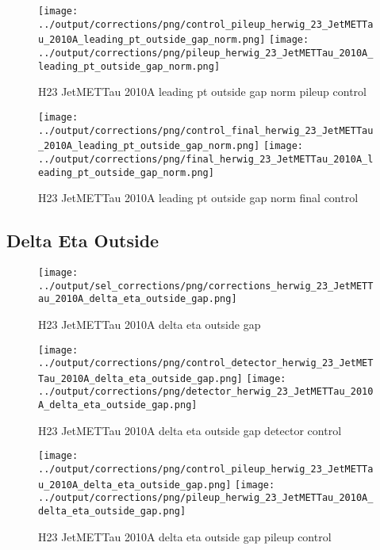 \documentclass[11pt]{book}
\begin{document}
\begin{figure}[ht]
\centering
\texttt{[image: ../output/corrections/png/control\_pileup\_herwig\_23\_JetMETTau\_2010A\_leading\_pt\_outside\_gap\_norm.png]}
\texttt{[image: ../output/corrections/png/pileup\_herwig\_23\_JetMETTau\_2010A\_leading\_pt\_outside\_gap\_norm.png]}
\caption{H23 JetMETTau 2010A leading pt outside gap norm pileup control}
\label{fig:H23_JetMETTau_2010A_leading_pt_outside_gap_norm_pileup_control}
\end{figure}


\begin{figure}[ht]
\centering
\texttt{[image: ../output/corrections/png/control\_final\_herwig\_23\_JetMETTau\_2010A\_leading\_pt\_outside\_gap\_norm.png]}
\texttt{[image: ../output/corrections/png/final\_herwig\_23\_JetMETTau\_2010A\_leading\_pt\_outside\_gap\_norm.png]}
\caption{H23 JetMETTau 2010A leading pt outside gap norm final control}
\label{fig:H23_JetMETTau_2010A_leading_pt_outside_gap_norm_final_control}
\end{figure}



\clearpage
\subsection{Delta Eta Outside}
\begin{figure}[ht]
\centering
\texttt{[image: ../output/sel\_corrections/png/corrections\_herwig\_23\_JetMETTau\_2010A\_delta\_eta\_outside\_gap.png]}
\caption{H23 JetMETTau 2010A delta eta outside gap}
\label{fig:H23_JetMETTau_2010A_delta_eta_outside_gap}
\end{figure}

\begin{figure}[ht]
\centering
\texttt{[image: ../output/corrections/png/control\_detector\_herwig\_23\_JetMETTau\_2010A\_delta\_eta\_outside\_gap.png]}
\texttt{[image: ../output/corrections/png/detector\_herwig\_23\_JetMETTau\_2010A\_delta\_eta\_outside\_gap.png]}
\caption{H23 JetMETTau 2010A delta eta outside gap detector control}
\label{fig:H23_JetMETTau_2010A_delta_eta_outside_gap_detector_control}
\end{figure}

\begin{figure}[ht]
\centering
\texttt{[image: ../output/corrections/png/control\_pileup\_herwig\_23\_JetMETTau\_2010A\_delta\_eta\_outside\_gap.png]}
\texttt{[image: ../output/corrections/png/pileup\_herwig\_23\_JetMETTau\_2010A\_delta\_eta\_outside\_gap.png]}
\caption{H23 JetMETTau 2010A delta eta outside gap pileup control}
\label{fig:H23_JetMETTau_2010A_delta_eta_outside_gap_pileup_control}
\end{figure}
\end{document}
